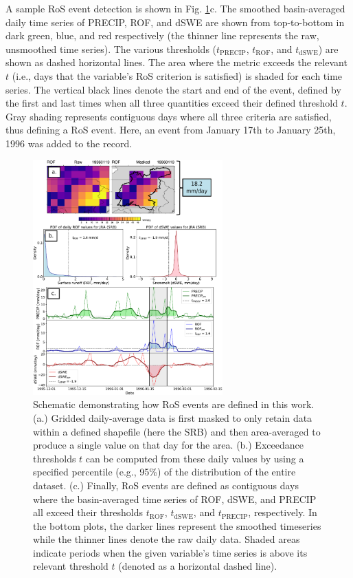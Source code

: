 \documentclass[nhess, manuscript]{copernicus}
\begin{document}
A sample RoS event detection is shown in Fig. \ref{fig:schematic}c.
The smoothed basin-averaged daily time series of PRECIP, ROF, and dSWE are shown from top-to-bottom in dark green, blue, and red respectively (the thinner line represents the raw, unsmoothed time series).
The various thresholds ($t_{\textrm{PRECIP}}$, $t_{\textrm{ROF}}$, and $t_{\textrm{dSWE}}$) are shown as dashed horizontal lines. The area where the metric exceeds the relevant $t$ (i.e., days that the variable's RoS criterion is satisfied) is shaded for each time series.
The vertical black lines denote the start and end of the event, defined by the first and last times when all three quantities exceed their defined threshold $t$.
Gray shading represents contiguous days where all three criteria are satisfied, thus defining a RoS event. Here, an event from January 17th to January 25th, 1996 was added to the record.

\begin{figure}
\noindent\includegraphics[width=0.65\textwidth]{f01-schematic.pdf}
\caption{Schematic demonstrating how RoS events are defined in this work. (a.) Gridded daily-average data is first masked to only retain data within a defined shapefile (here the SRB) and then area-averaged to produce a single value on that day for the area. (b.) Exceedance thresholds $t$ can be computed from these daily values by using a specified percentile (e.g., 95\%) of the distribution of the entire dataset. (c.) Finally, RoS events are defined as contiguous days where the basin-averaged time series of ROF, dSWE, and PRECIP all exceed their thresholds $t_{\textrm{ROF}}$, $t_{\textrm{dSWE}}$, and $t_{\textrm{PRECIP}}$, respectively. In the bottom plots, the darker lines represent the smoothed timeseries while the thinner lines denote the raw daily data. Shaded areas indicate periods when the given variable's time series is above its relevant threshold $t$ (denoted as a horizontal dashed line).}
\label{fig:schematic}
\end{figure}
\end{document}
